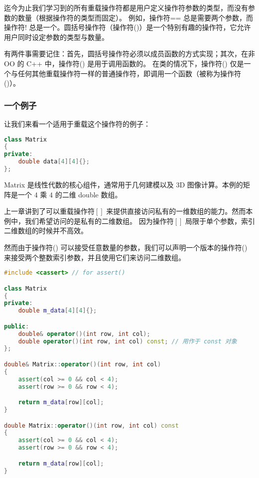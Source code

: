 \documentclass[../../LearnCpp.tex]{subfiles}
\begin{document}

迄今为止我们学习到的所有重载操作符都是用户定义操作符参数的类型，而没有参数的数量（根据操作符的类型而固定）。
例如，操作符== 总是需要两个参数，而操作符! 总是一个。圆括号操作符（操作符()）是一个特别有趣的操作符，它允许用户同时设定参数的类型与数量。

有两件事需要记住：首先，圆括号操作符必须以成员函数的方式实现；其次，在非 OO 的 C++ 中，操作符() 是用于调用函数的。
在类的情况下，操作符() 仅是一个与任何其他重载操作符一样的普通操作符，即调用一个函数（被称为操作符()）。

\subsubsection*{一个例子}

让我们来看一个适用于重载这个操作符的例子：

\begin{lstlisting}[language=C++]
class Matrix
{
private:
    double data[4][4]{};
};
\end{lstlisting}

Matrix 是线性代数的核心组件，通常用于几何建模以及 3D 图像计算。本例的矩阵是一个 4 乘 4 的二维 double 数组。

上一章讲到了可以重载操作符$\left[\right]$ 来提供直接访问私有的一维数组的能力。然而本例中，我们希望访问的是私有的二维数组。
因为操作符$\left[\right]$ 局限于单个参数，索引二维数组的时候并不高效。

然而由于操作符() 可以接受任意数量的参数，我们可以声明一个版本的操作符() 来接受两个整数索引参数，并且使用它们来访问二维数组。

\begin{lstlisting}[language=C++]
#include <cassert> // for assert()

class Matrix
{
private:
    double m_data[4][4]{};

public:
    double& operator()(int row, int col);
    double operator()(int row, int col) const; // 用作于 const 对象
};

double& Matrix::operator()(int row, int col)
{
    assert(col >= 0 && col < 4);
    assert(row >= 0 && row < 4);

    return m_data[row][col];
}

double Matrix::operator()(int row, int col) const
{
    assert(col >= 0 && col < 4);
    assert(row >= 0 && row < 4);

    return m_data[row][col];
}
\end{lstlisting}
\end{document}

